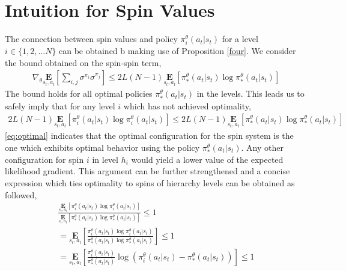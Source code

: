 \documentclass{article}
\begin{document}
\section{Intuition for Spin Values}
The connection between spin values and policy $\pi^{\theta}_{i}(a_{t}|s_{t})$ for a level $i \in \{1,2,...N\}$ can be obtained b making use of Proposition \autoref{four}. We consider the bound obtained on the spin-spin term,
\begin{gather}
    \nabla_{\theta}\underset{s_{t},a_{t}}{\textbf{E}}[\sum_{i,j}\sigma^{\pi_{i}}\sigma^{\pi_{j}}] \leq 2L(N-1)\underset{s_{t},a_{t}}{\textbf{E}}[\pi^{\theta}_{*}(a_{t}|s_{t})\log \pi^{\theta}_{*}(a_{t}|s_{t})] \nonumber
\end{gather} 
The bound holds for all optimal policies $\pi^{\theta}_{*}(a_{t}|s_{t})$ in the levels. This leads us to safely imply that for any level $i$ which has not achieved optimality,
\begin{gather}
    2L(N-1)\underset{s_{t},a_{t}}{\textbf{E}}[\pi^{\theta}_{i}(a_{t}|s_{t})\log \pi^{\theta}_{i}(a_{t}|s_{t})] \leq 2L(N-1)\underset{s_{t},a_{t}}{\textbf{E}}[\pi^{\theta}_{*}(a_{t}|s_{t})\log \pi^{\theta}_{*}(a_{t}|s_{t})]  \label{eq:optimal}
\end{gather} 
\autoref{eq:optimal} indicates that the optimal configuration for the spin system is the one which exhibits optimal behavior using the policy $\pi^{\theta}_{*}(a_{t}|s_{t})$. Any other configuration for spin $i$ in level $h_{i}$ would yield a lower value of the expected likelihood gradient. This argument can be further strengthened and a concise expression which ties optimality to spins of hierarchy levels can be obtained as followed,
\begin{gather}
    \frac{\underset{s_{t},a_{t}}{\textbf{E}}[\pi^{\theta}_{i}(a_{t}|s_{t})\log \pi^{\theta}_{i}(a_{t}|s_{t})]}{\underset{s_{t},a_{t}}{\textbf{E}}[\pi^{\theta}_{*}(a_{t}|s_{t})\log \pi^{\theta}_{*}(a_{t}|s_{t})]} \leq 1 \nonumber \\
    = \underset{s_{t},a_{t}}{\textbf{E}}[\frac{\pi^{\theta}_{i}(a_{t}|s_{t})\log \pi^{\theta}_{i}(a_{t}|s_{t})}{\pi^{\theta}_{*}(a_{t}|s_{t})\log \pi^{\theta}_{*}(a_{t}|s_{t})}] \leq 1 \nonumber \\
    = \underset{s_{t},a_{t}}{\textbf{E}}[\frac{\pi^{\theta}_{i}(a_{t}|s_{t})}{\pi^{\theta}_{*}(a_{t}|s_{t})}\log(\pi^{\theta}_{i}(a_{t}|s_{t}) - \pi^{\theta}_{*}(a_{t}|s_{t}))] \leq 1 \label{eq:connect}    
\end{gather}
\end{document}

